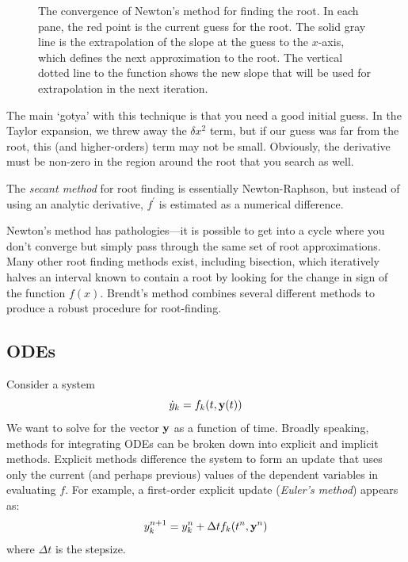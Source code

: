 \begin{figure}
\caption[Convergence of Newton's method for root finding]{\label{fig:newtonsmethod} The convergence of Newton's method
for finding the root.  In each pane, the red point is the current guess
for the root.  The solid gray line is the extrapolation of the slope
at the guess to the $x$-axis, which defines the next approximation
to the root.  The vertical dotted line to the function shows the new
slope that will be used for extrapolation in the next iteration.}
\end{figure}


The main `gotya' with this technique is that you need a good initial guess.
In the Taylor expansion, we threw away the $\delta x^2$ term, but if our
guess was far from the root, this (and higher-orders) term may not be small.
Obviously, the derivative must be non-zero in the region around the 
root that you search as well.

The {\em secant method} for root finding is essentially
Newton-Raphson, but instead of using an analytic derivative,
$f^\prime$ is estimated as a numerical difference.

Newton's method has pathologies---it is possible to get into a cycle
where you don't converge but simply pass through the same set of
root approximations.
Many other root finding methods exist, including bisection, which
iteratively halves an interval known to contain a root by looking for
the change in sign of the function $f(x)$.  Brendt's method combines
several different methods to produce a robust procedure for root-finding.

\subsection{ODEs}

Consider a system 
\begin{equation}
\dot{y}_k = f_k(t, {\bf y}(t))
\end{equation}
We want to solve for the vector ${\bf y}$ as a function of time.
Broadly speaking, methods for integrating ODEs can be broken down into
explicit and implicit methods.  Explicit methods difference the system
to form an update that uses only the current (and perhaps previous)
values of the dependent variables in evaluating $f$.  For example, a
first-order explicit update ({\em Euler's method}) appears as:
\begin{equation}
y^{n+1}_k = y^n_k + \Delta t f_k(t^n, {\bf y}^n)
\end{equation}
where $\Delta t$ is the stepsize. 


